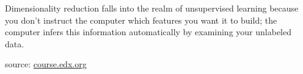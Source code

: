 \documentclass{article}
\begin{document}
\par Dimensionality reduction falls into the realm of unsupervised learning because you don't instruct the computer which features you want it to build; the computer infers this information automatically by examining your unlabeled data.

\begin{flushright}
    source: \href{https://courses.edx.org/courses/course-v1:Microsoft+DAT210x+6T2016/courseware/e36e6b45ae5d4032bef2ec557c1ff48f/a8cf8333f6044e9b9a357b7797f282e3/?child=first}{course.edx.org}  
\end{flushright}
\end{document}
